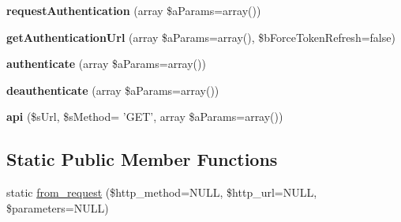 \begin{DoxyCompactItemize}
\item 
\hypertarget{class_o_auth_client_a1a1896cb813d1ac646a1b4259616ab49}{{\bfseries request\-Authentication} (array \$a\-Params=array())}\label{class_o_auth_client_a1a1896cb813d1ac646a1b4259616ab49}

\item 
\hypertarget{class_o_auth_client_a490d0b6ecb0a5101f5a8046df11914d8}{{\bfseries get\-Authentication\-Url} (array \$a\-Params=array(), \$b\-Force\-Token\-Refresh=false)}\label{class_o_auth_client_a490d0b6ecb0a5101f5a8046df11914d8}

\item 
\hypertarget{class_o_auth_client_aefdfd374d0cafb4867e9d3dab2c5b624}{{\bfseries authenticate} (array \$a\-Params=array())}\label{class_o_auth_client_aefdfd374d0cafb4867e9d3dab2c5b624}

\item 
\hypertarget{class_o_auth_client_adb1e2aa10843a245bd48b2b83a61f128}{{\bfseries deauthenticate} (array \$a\-Params=array())}\label{class_o_auth_client_adb1e2aa10843a245bd48b2b83a61f128}

\item 
\hypertarget{class_o_auth_client_a18d024da1466bbb3c323eb3b10302b90}{{\bfseries api} (\$s\-Url, \$s\-Method= 'G\-E\-T', array \$a\-Params=array())}\label{class_o_auth_client_a18d024da1466bbb3c323eb3b10302b90}

\end{DoxyCompactItemize}
\subsection*{Static Public Member Functions}
\begin{DoxyCompactItemize}
\item 
static \hyperlink{class_o_auth_client_a634d155eb789a8b326e27a6b2bbf3083}{from\-\_\-request} (\$http\-\_\-method=N\-U\-L\-L, \$http\-\_\-url=N\-U\-L\-L, \$parameters=N\-U\-L\-L)
\end{DoxyCompactItemize}


